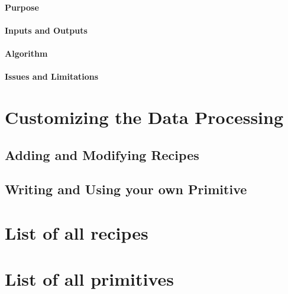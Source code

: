 \documentclass[letterpaper,10pt,english]{sphinxmanual}
\begin{document}
\subsubsection{Purpose}
\label{NIRI/primitives_pages/primitive2:purpose}

\subsubsection{Inputs and Outputs}
\label{NIRI/primitives_pages/primitive2:inputs-and-outputs}

\subsubsection{Algorithm}
\label{NIRI/primitives_pages/primitive2:algorithm}

\subsubsection{Issues and Limitations}
\label{NIRI/primitives_pages/primitive2:issues-and-limitations}

\chapter{Customizing the Data Processing}
\label{RecipeSystem/customize:customizing-the-data-processing}\label{RecipeSystem/customize::doc}

\section{Adding and Modifying Recipes}
\label{RecipeSystem/customize:adding-and-modifying-recipes}

\section{Writing and Using your own Primitive}
\label{RecipeSystem/customize:writing-and-using-your-own-primitive}%
\appendix
\noappendicestocpagenum
\addappheadtotoc

\chapter{List of all recipes}
\label{RecipeSystem/appendices/appendix_listrecipes::doc}\label{RecipeSystem/appendices/appendix_listrecipes:list-of-all-recipes}

\chapter{List of all primitives}
\label{RecipeSystem/appendices/appendix_listprimitives::doc}\label{RecipeSystem/appendices/appendix_listprimitives:list-of-all-primitives}


\renewcommand{\indexname}{Index}
\printindex
\end{document}

